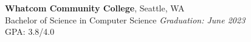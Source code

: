 \textbf{Whatcom Community College}, Seattle, WA \\
Bachelor of Science in Computer Science \hfill \textit{Graduation: June 2023} \\
GPA: 3.8/4.0 \\[0.5em]